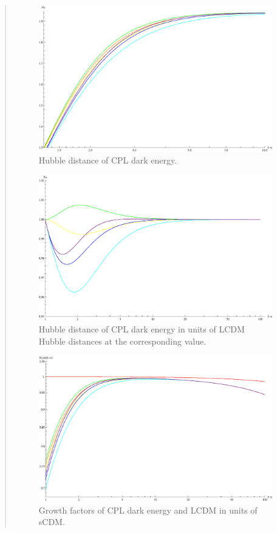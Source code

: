 \documentclass{article}
\begin{document}
\begin{quotation}
{\begin{enumerate}
\begin{figure}[!htpb]
\centering
\includegraphics[width=350pt]{CPL_Supp_HubbleDistances_Cut.eps}
\caption{\color{blue}Hubble distance of CPL dark energy.}\label{fig:CPL_Supp_HubbleDistances_Cut}
\end{figure}

\begin{figure}[!htpb]
\centering
\includegraphics[width=350pt]{CPL_Supp_HubbleDistances_DivideLCDM.eps}
\caption{\color{blue}Hubble distance of CPL dark energy in units of LCDM Hubble distances at the corresponding value.}\label{fig:CPL_Supp_HubbleDistances_DivideLCDM}
\end{figure}

\begin{figure}[!htpb]
\centering
\includegraphics[width=350pt]{CPL_Supp_GrowthFactors.eps}
\caption{\color{blue}Growth factors of CPL dark energy and LCDM in units of sCDM.}\label{fig:CPL_Supp_GrowthFactors}
\end{figure}


\end{enumerate}}
\end{quotation}
\end{document}
